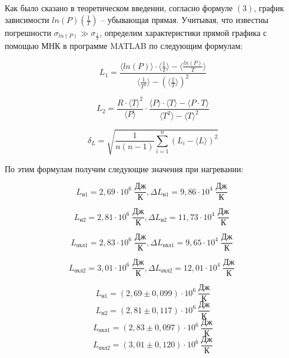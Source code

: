\documentclass[a4paper,11.5pt]{article} %
\begin{document}
Как было сказано в теоретическом введении, согласно формуле $(3)$, график зависимости $ln(P)\left( \frac{1}{T}\right)$ -- убывающая прямая. Учитывая, что известны погрешности $\sigma_{ln(P)} \gg \sigma_{\frac{1}{T}}$, определим характеристики прямой графика с помощью МНК в программе MATLAB по следующим формулам:

\begin{equation}
	L_1 = \frac{\langle ln(P) \rangle \cdot \langle \frac{1}{T} \rangle - \langle \frac{ln(P)}{T} \rangle}{\langle \frac{1}{T^2} \rangle  - \left( \langle \frac{1}{T} \rangle  \right)^2}
\end{equation}

\begin{equation}
	L_2 = \frac{R\cdot \langle T \rangle^2}{\langle P \rangle}\cdot\frac{\langle P \rangle \cdot \langle T \rangle - \langle P\cdot T \rangle}{\langle T^2 \rangle  -  \langle T \rangle^2}
\end{equation}


\begin{equation}
	\delta_{L} = \sqrt{\frac{1}{n(n-1)}\sum_{i=1}^n(L_i - \langle L\rangle)^2}
\end{equation}

По этим формулам получим следующие значения при нагревании:

\begin{equation}
	L_{\text{н}1} = 2,69 \cdot 10^6 \; \frac{\text{Дж}}{\text{К}}, \Delta L_{\text{н}1} = 9,86 \cdot 10^4 \; \frac{\text{Дж}}{\text{К}}\;
\end{equation}

\begin{equation}
	L_{\text{н}2} = 2,81 \cdot 10^6 \; \frac{\text{Дж}}{\text{К}}, \Delta L_{\text{н}2} = 11,73 \cdot 10^4 \; \frac{\text{Дж}}{\text{К}}\;
\end{equation}

\begin{equation}
	L_{\text{охл}1} = 2,83 \cdot 10^6 \; \frac{\text{Дж}}{\text{К}}, \Delta L_{\text{охл}1} = 9,65 \cdot 10^4 \; \frac{\text{Дж}}{\text{К}}\; 
\end{equation}

\begin{equation}
	L_{\text{охл}2} = 3,01 \cdot 10^6 \; \frac{\text{Дж}}{\text{К}}, \Delta L_{\text{охл}2} = 12,01 \cdot 10^4 \; \frac{\text{Дж}}{\text{К}}\; 
\end{equation}

\begin{equation}
L_{\text{н}1} = (2,69 \pm 0,099) \cdot 10^6\  \frac{\text{Дж}}{\text{К}}
\end{equation}
\begin{equation}
L_{\text{н}2} = (2,81 \pm 0,117) \cdot 10^6\  \frac{\text{Дж}}{\text{К}}
\end{equation}
\begin{equation}
L_{\text{охл}1} = (2,83 \pm 0,097) \cdot 10^6\  \frac{\text{Дж}}{\text{К}}
\end{equation}
\begin{equation}
L_{\text{охл}2} = (3,01 \pm 0,120) \cdot 10^6\  \frac{\text{Дж}}{\text{К}}
\end{equation}
\end{document}
